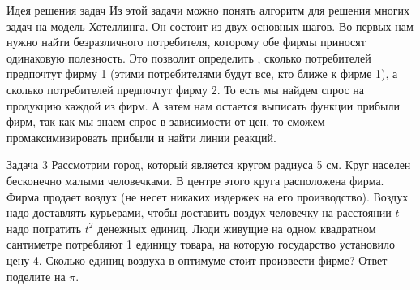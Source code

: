 \begin{mybox}{Идея решения задач}
    Из этой задачи можно понять алгоритм для решения многих задач на модель Хотеллинга. Он состоит из двух основных
    шагов. Во-первых нам
    нужно найти безразличного потребителя, которому обе фирмы приносят одинаковую полезность. Это позволит определить
    , сколько потребителей предпочтут фирму 1 (этими потребителями будут все, кто ближе к фирме 1), а сколько
    потребителей предпочтут фирму 2. То есть мы найдем спрос на продукцию каждой из фирм. А затем нам остается выписать
    функции прибыли фирм, так как мы знаем спрос в зависимости от цен, то сможем промаксимизировать прибыли и найти
    линии реакций.
\end{mybox}
\begin{mybox}{Задача 3}
    \indent\setlength{\parindent}{1em}\indent\setlength{\parindent}{1em}Рассмотрим город, который является кругом радиуса 5 см. Круг населен бесконечно малыми человечками. В центре этого
    круга расположена фирма. Фирма продает воздух (не несет никаких издержек на его производство). Воздух надо
    доставлять курьерами, чтобы доставить воздух
    человечку
    на расстоянии $t$ надо потратить $t^2$ денежных единиц. Люди живущие на одном квадратном сантиметре потребляют 1
    единицу товара, на которую государство установило цену 4. Сколько единиц воздуха в оптимуме стоит произвести
    фирме? Ответ поделите на $\pi$.
\end{mybox}

